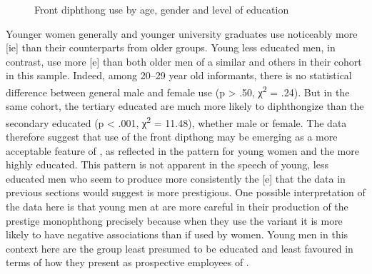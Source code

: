     
\begin{figure}
\caption{Front diphthong use by age, gender and level of education\label{fig:4}}
\end{figure}
 


  Younger women generally and younger university graduates use noticeably more [ie] than their counterparts from older  groups.  Young less educated men, in contrast, use more [e] than both older men of a similar  and others in their  cohort in this sample.  Indeed, among 20--29 year old informants, there is no statistical difference between general male and female use (p > .50, χ\textsuperscript{2} = .24).  But in the same  cohort, the tertiary educated are much more likely to diphthongize than the secondary educated (p < .001, χ\textsuperscript{2} = 11.48), whether male or female.  The data therefore suggest that use of the front dipthong may be emerging as a more acceptable feature of , as reflected in the pattern for young women and the more highly educated.  This pattern is not apparent in the speech of young, less educated men who seem to produce more consistently the [e] that the data in previous sections would suggest is more prestigious.  One possible interpretation of the data here is that young men at  are more careful in their production of the prestige monophthong precisely because when they use the  variant it is more likely to have negative associations than if used by women.  Young men in this context here are the group least presumed to be educated and least favoured in terms of how they present as prospective employees of . 

